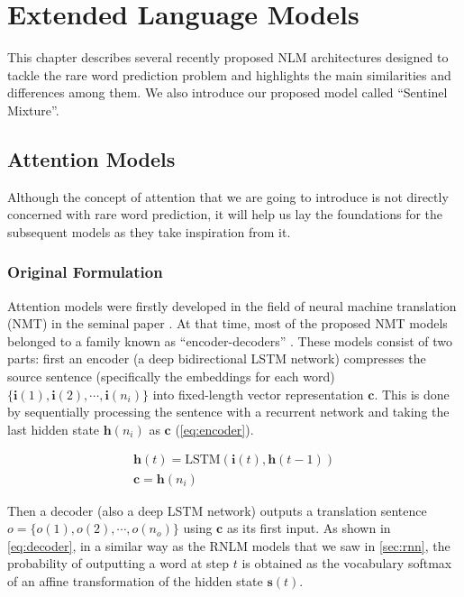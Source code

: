 \chapter{Extended Language Models}

This chapter describes several recently proposed NLM architectures designed to tackle the rare word prediction problem and highlights the main similarities and differences among them. We also introduce our proposed model called ``Sentinel Mixture''.

\section{Attention Models}
\label{sec:attention}

Although the concept of attention that we are going to introduce is not directly concerned with rare word prediction, it will help us lay the foundations for the subsequent models as they take inspiration from it.

\subsection{Original Formulation}

Attention models were firstly developed in the field of neural machine translation (NMT) in the seminal paper \cite{bahdanau2014neural}. At that time, most of the proposed NMT models belonged to a family known as ``encoder-decoders'' \cite{sutskever2014sequence}. These models consist of two parts: first an encoder (a deep bidirectional LSTM network) compresses the source sentence (specifically the embeddings for each word) $\{\mathbf{i}(1), \mathbf{i}(2), \cdots, \mathbf{i}(n_i)\}$ into fixed-length vector representation $\mathbf{c}$. This is done by sequentially processing the sentence with a recurrent network and taking the last hidden state $\mathbf{h}(n_i)$ as $\mathbf{c}$ (\autoref{eq:encoder}).

\begin{equation} \label{eq:encoder}
	\begin{gathered}
		\mathbf{h}(t) = \text{LSTM}(\mathbf{i}(t), \mathbf{h}(t-1)) \\
		\mathbf{c} = \mathbf{h}(n_i)
	\end{gathered}
\end{equation}

Then a decoder (also a deep LSTM network) outputs a translation sentence $o=\{o(1), o(2), \cdots, o(n_o)\}$ using $\mathbf{c}$ as its first input. As shown in \autoref{eq:decoder}, in a similar way as the RNLM models that we saw in \autoref{sec:rnn}, the probability of outputting a word at step $t$ is obtained as the vocabulary softmax of an affine transformation of the hidden state $\mathbf{s}(t)$.

